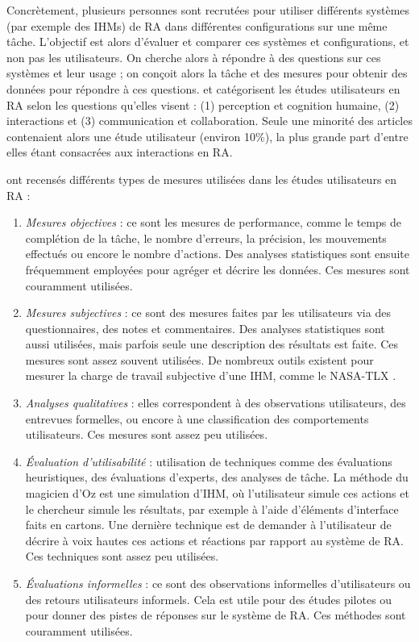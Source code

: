 Concrètement, plusieurs personnes sont recrutées pour utiliser différents systèmes (par exemple des IHMs) de RA dans différentes configurations sur une même tâche. L'objectif est alors d'évaluer et comparer ces systèmes et configurations, et non pas les utilisateurs. On cherche alors à répondre à des questions sur ces systèmes et leur usage ; on conçoit alors la tâche et des mesures pour obtenir des données pour répondre à ces questions. \cite{Swan2005} et \cite{Duenser2008} catégorisent les études utilisateurs en RA selon les questions qu'elles visent : (1) perception et cognition humaine, (2) interactions et (3) communication et collaboration. Seule une minorité des articles contenaient alors une étude utilisateur (environ 10\%), la plus grande part d'entre elles étant consacrées aux interactions en RA.

\cite{Duenser2008} ont recensés différents types de mesures utilisées dans les études utilisateurs en RA :
\begin{enumerate}
  \item \emph{Mesures objectives} : ce sont les mesures de performance, comme le temps de complétion de la tâche, le nombre d'erreurs, la précision, les mouvements effectués ou encore le nombre d'actions. Des analyses statistiques sont ensuite fréquemment employées pour agréger et décrire les données. Ces mesures sont couramment utilisées.
  \item \emph{Mesures subjectives} : ce sont des mesures faites par les utilisateurs via des questionnaires, des notes et commentaires. Des analyses statistiques sont aussi utilisées, mais parfois seule une description des résultats est faite. Ces mesures sont assez souvent utilisées. De nombreux outils existent pour mesurer la charge de travail subjective d'une IHM, comme le NASA-TLX \citep{Rubio2004}.
  \item \emph{Analyses qualitatives} : elles correspondent à des observations utilisateurs, des entrevues formelles, ou encore à une classification des comportements utilisateurs. Ces mesures sont assez peu utilisées.
  \item \emph{Évaluation d'utilisabilité} : utilisation de techniques comme des évaluations heuristiques, des évaluations d'experts, des analyses de tâche. La méthode du magicien d'Oz est une simulation d'IHM, où l'utilisateur simule ces actions et le chercheur simule les résultats, par exemple à l'aide d'éléments d'interface faits en cartons. Une dernière technique est de demander à l'utilisateur de décrire à voix hautes ces actions et réactions par rapport au système de RA. Ces techniques sont assez peu utilisées.
  \item \emph{Évaluations informelles} : ce sont des observations informelles d'utilisateurs ou des retours utilisateurs informels. Cela est utile pour des études pilotes ou pour donner des pistes de réponses sur le système de RA. Ces méthodes sont couramment utilisées.
\end{enumerate}


